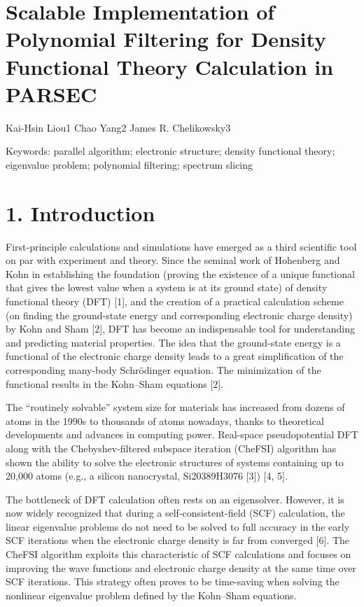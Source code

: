 \documentclass[
  10
]{article}
\author{}
\date{}
\begin{document}
\section{Scalable Implementation of Polynomial Filtering for Density
Functional Theory Calculation in
PARSEC}\label{scalable-implementation-of-polynomial-filtering-for-density-functional-theory-calculation-in-parsec}

Kai-Hsin Liou1 Chao Yang2 James R. Chelikowsky3

Keywords: parallel algorithm; electronic structure; density functional
theory; eigenvalue problem; polynomial filtering; spectrum slicing

\section{1. Introduction}\label{introduction}

First-principle calculations and simulations have emerged as a third
scientific tool on par with experiment and theory. Since the seminal
work of Hohenberg and Kohn in establishing the foundation (proving the
existence of a unique functional that gives the lowest value when a
system is at its ground state) of density functional theory (DFT)
{[}1{]}, and the creation of a practical calculation scheme (on finding
the ground-state energy and corresponding electronic charge density) by
Kohn and Sham {[}2{]}, DFT has become an indispensable tool for
understanding and predicting material properties. The idea that the
ground-state energy is a functional of the electronic charge density
leads to a great simplification of the corresponding many-body
Schrödinger equation. The minimization of the functional results in the
Kohn--Sham equations {[}2{]}.

The ``routinely solvable'' system size for materials has increased from
dozens of atoms in the 1990s to thousands of atoms nowadays, thanks to
theoretical developments and advances in computing power. Real-space
pseudopotential DFT along with the Chebyshev-filtered subspace iteration
(CheFSI) algorithm has shown the ability to solve the electronic
structures of systems containing up to 20,000 atoms (e.g., a silicon
nanocrystal, Si20389H3076 {[}3{]}) {[}4, 5{]}.

The bottleneck of DFT calculation often rests on an eigensolver.
However, it is now widely recognized that during a self-consistent-field
(SCF) calculation, the linear eigenvalue problems do not need to be
solved to full accuracy in the early SCF iterations when the electronic
charge density is far from converged {[}6{]}. The CheFSI algorithm
exploits this characteristic of SCF calculations and focuses on
improving the wave functions and electronic charge density at the same
time over SCF iterations. This strategy often proves to be time-saving
when solving the nonlinear eigenvalue problem defined by the Kohn--Sham
equations.
\end{document}
